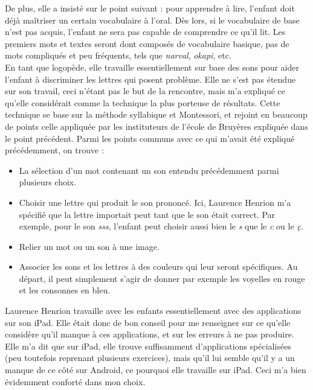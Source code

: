 De plus, elle a insisté sur le point suivant : pour apprendre à lire, l'enfant doit déjà maîtriser un certain vocabulaire à l'oral. Dès lors, si le vocabulaire de base n'est pas acquis, l'enfant ne sera pas capable de comprendre ce qu'il lit. Les premiers mots et textes seront dont composés de vocabulaire basique, pas de mots compliqués et peu fréquents, tels que \textit{narval}, \textit{okapi}, etc. \\

En tant que logopède, elle travaille essentiellement sur base des sons pour aider l'enfant à discriminer les lettres qui posent problème. Elle ne s'est pas étendue sur son travail, ceci n'étant pas le but de la rencontre, mais m'a  expliqué ce qu'elle considérait comme la technique la plus porteuse de résultats. Cette technique se base sur la méthode syllabique et Montessori, et rejoint en beaucoup de points celle appliquée par les instituteurs de l'école de Bruyères expliquée dans le point précédent. Parmi les points communs avec ce qui m'avait été expliqué précédemment, on trouve :
\begin{itemize}
\item La sélection d'un mot contenant un son entendu précédemment parmi plusieurs choix.
\item Choisir une lettre qui produit le son prononcé. Ici, Laurence Henrion m'a spécifié que la lettre importait peut tant que le son était correct. Par exemple, pour le son \textit{sss}, l'enfant peut choisir aussi bien le \textit{s} que le \textit{c} ou le \textit{ç.}
\item Relier un mot ou un son à une image.
\item Associer les sons et les lettres à des couleurs qui leur seront spécifiques. Au départ, il peut simplement s'agir de donner par exemple les voyelles en rouge et les consonnes en bleu.\\
\end{itemize}

Laurence Henrion travaille avec les enfants essentiellement avec des applications sur son iPad. Elle était donc de bon conseil pour me renseigner sur ce qu'elle considère qu'il manque à ces applications, et sur les erreurs à ne pas produire. Elle m'a dit que sur iPad, elle trouve suffisamment d'applications spécialisées (peu toutefois reprenant plusieurs exercices), mais qu'il lui semble qu'il y a un manque de ce côté sur Android, ce pourquoi elle travaille sur iPad. Ceci m'a bien évidemment conforté dans mon choix.